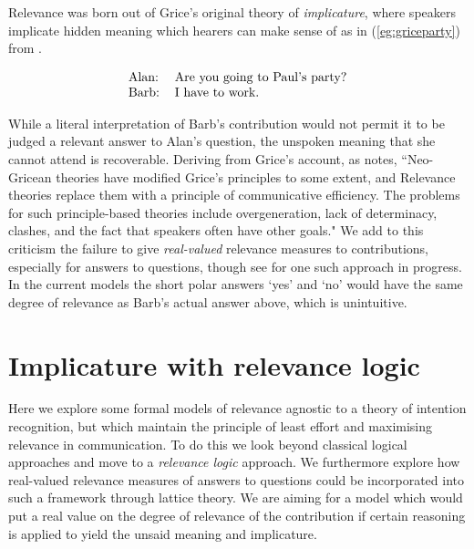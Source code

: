 \documentclass[11pt,a4paper]{article}
\theoremstyle{definition}
\begin{document}
Relevance was born out of Grice's original theory of \textit{implicature}, where speakers implicate hidden meaning which hearers can make sense of as in (\ref{eg:griceparty}) from \cite{Davis2014implicature}.

\vspace*{-0.35cm}
\begin{equation}
\label{eg:griceparty}
\text{
\begin{tabular}{ll}
    Alan: & Are you going to Paul's party?\\
    Barb: & I have to work.
\end{tabular}
}
\end{equation}
\vspace*{-0.35cm}

While a literal interpretation of Barb's contribution would not permit it to be judged a relevant answer to Alan's question, the unspoken meaning that she cannot attend is recoverable. Deriving from Grice's account, as  notes, ``Neo-Gricean theories have modified Grice's principles to some extent, and Relevance theories replace them with a principle of communicative efficiency. The problems for such principle-based theories include overgeneration, lack of determinacy, clashes, and the fact that speakers often have other goals." We add to this criticism the failure to give \textit{real-valued} relevance measures to contributions, especially for answers to questions, though see \cite{HoughPurver2017Lattices} for one such approach in progress. In the current models the short polar answers `yes' and `no' would have the same degree of relevance as Barb's actual answer above, which is unintuitive.


\section{Implicature with relevance logic}

Here we explore some formal models of relevance agnostic to a theory of intention recognition, but which maintain the principle of least effort and maximising relevance in communication. To do this we look beyond classical logical approaches and move to a \textit{relevance logic} approach. We furthermore explore how real-valued relevance measures of answers to questions could be incorporated into such a framework through lattice theory. We are aiming for a model which would put a real value on the degree of relevance of the contribution if certain reasoning is applied to yield the unsaid meaning and implicature.
\end{document}
